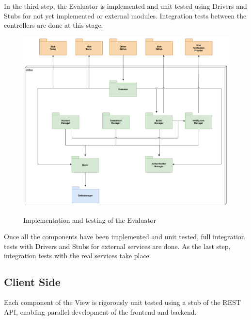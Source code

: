 \documentclass{Configuration_Files/Template}
\begin{document}
In the third step, the Evaluator is implemented and unit tested using Drivers and Stubs for not yet implemented or external modules. Integration tests between the controllers are done at this stage.

\begin{figure}[H]
\centering
\includegraphics[scale = 0.55]{DD_latex/Images/diagrams/ImplementationPlan_SS_Third.png}\\
\caption{Implementation and testing of the Evaluator}
\end{figure}

Once all the components have been implemented and unit tested, full integration tests with Drivers and Stubs for external services are done. As the last step, integration tests with the real services take place.

\subsection{Client Side}

Each component of the View is rigorously unit tested using a stub of the REST API, enabling parallel development of the frontend and backend.
\end{document}
